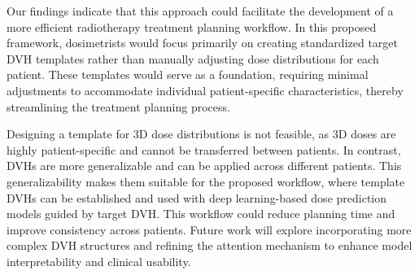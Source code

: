 Our findings indicate that this approach could facilitate the development of a more efficient radiotherapy treatment planning workflow.
In this proposed framework, dosimetrists would focus primarily on creating standardized target DVH templates rather than manually adjusting dose distributions for each patient.
These templates would serve as a foundation, requiring minimal adjustments to accommodate individual patient-specific characteristics, thereby streamlining the treatment planning process.

Designing a template for 3D dose distributions is not feasible, as 3D doses are highly patient-specific and cannot be transferred between patients.
In contrast, DVHs are more generalizable and can be applied across different patients.
This generalizability makes them suitable for the proposed workflow, where template DVHs can be established and used with deep learning-based dose prediction models guided by target DVH.
This workflow could reduce planning time and improve consistency across patients.
Future work will explore incorporating more complex DVH structures and refining the attention mechanism to enhance model interpretability and clinical usability.





%
%
%
